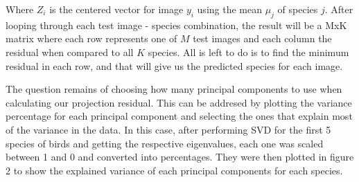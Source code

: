 \documentclass[11pt]{article}
\begin{document}
\begin{singlespace}
\begin{enumerate}
Where $Z_i$ is the centered vector for image $y_i$ using the mean $\mu_j$ of species $j$. After looping through each test image - species combination, the result will be a MxK matrix where each row represents one of $M$ test images and each column the residual when compared to all $K$ species. All is left to do is to find the minimum residual in each row, and that will give us the predicted species for each image. 
\end{enumerate}

The question remains of choosing how many principal components to use when calculating our projection residual. This can be addresed by plotting the variance percentage for each principal component and selecting the ones that explain most of the variance in the data. In this case, after performing SVD for the first 5 species of birds and getting the respective eigenvalues, each one was scaled between 1 and 0 and converted into percentages. They were then plotted in figure 2 to show the explained variance of each principal components for each species. \\

\begin{figure}[h]
    \centering
    

\end{figure}
\end{singlespace}
\end{document}
